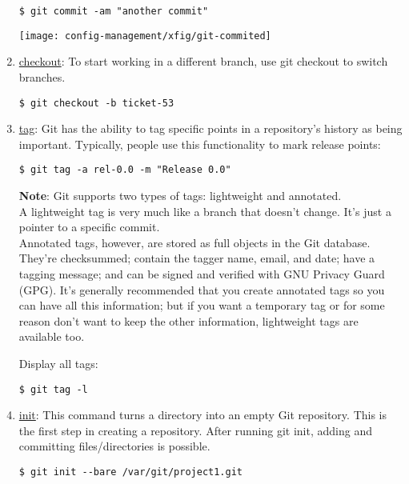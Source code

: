 \begin{enumerate}
\begin{lstlisting}
$ git commit -am "another commit"
  \end{lstlisting}
\begin{center}
\texttt{[image: config-management/xfig/git-commited]}
\end{center}
\newslide
\item \underline{checkout}: To start working in a different branch, use git checkout to switch branches.
  \begin{lstlisting}
$ git checkout -b ticket-53
  \end{lstlisting}
\newslide
\item \underline{tag}: Git has the ability to tag specific points in a repository’s history as being important. Typically, people use this functionality to mark release points:
\begin{lstlisting}
$ git tag -a rel-0.0 -m "Release 0.0"
\end{lstlisting}
{\bfseries Note}:
Git supports two types of tags: lightweight and annotated.\\
A lightweight tag is very much like a branch that doesn’t change.
It’s just a pointer to a specific commit.\\
Annotated tags, however, are stored as full objects in the Git database.
They’re checksummed; contain the tagger name, email, and date;
have a tagging message; and can be signed and verified with GNU
Privacy Guard (GPG). It’s generally recommended that you create
annotated tags so you can have all this information; but if you want
a temporary tag or for some reason don’t want to keep the other
information, lightweight tags are available too.


Display all tags:
\begin{lstlisting}
$ git tag -l
\end{lstlisting}
\newslide
\item \underline{init}:
This command turns a directory into an empty Git repository. This is the first step in creating a repository. After running git init, adding and committing files/directories is possible.
\begin{lstlisting}
$ git init --bare /var/git/project1.git
\end{lstlisting}


\end{enumerate}
